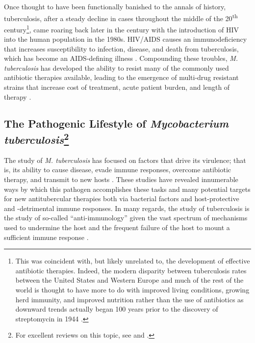 Once thought to have been functionally banished to the annals of history, tuberculosis, after a steady decline in cases throughout the middle of the 20\textsuperscript{th} century\footnote{This was coincident with, but likely unrelated to, the development of effective antibiotic therapies. Indeed, the modern disparity between tuberculosis rates between the United States and Western Europe and much of the rest of the world is thought to have more to do with improved living conditions, growing herd immunity, and improved nutrition rather than the use of antibiotics as downward trends actually began 100 years prior to the discovery of streptomycin in 1944 \citep{Lowbury1958}.}, came roaring back later in the century with the introduction of HIV into the human population in the 1980s. HIV/AIDS causes an immunodeficiency that increases susceptibility to infection, disease, and death from tuberculosis, which has become an AIDS\hyp{}defining illness \citep{Drobniewski1995, Selwyn1992}. Compounding these troubles, \textit{M. tuberculosis} has developed the ability to resist many of the commonly used antibiotic therapies available, leading to the emergence of multi\hyp{}drug resistant strains that increase cost of treatment, acute patient burden, and length of therapy \citep{Matteelli2014}.

\subsection[The Pathogenic Lifestyle of \textit{Mycobacterium tuberculosis}]{The Pathogenic Lifestyle of \textit{Mycobacterium tuberculosis}\footnote{For excellent reviews on this topic, see  and .}}\label{path:tb}

The study of \textit{M. tuberculosis} has focused on factors that drive its virulence; that is, its ability to cause disease, evade immune responses, overcome antibiotic therapy, and transmit to new hosts \citep{Glickman2001b}. These studies have revealed innumerable ways by which this pathogen accomplishes these tasks and many potential targets for new antitubercular therapies both via bacterial factors and host\hyp{}protective and \hyp{}detrimental immune responses. In many regards, the study of tuberculosis is the study of so\hyp{}called ``anti\hyp{}immunology'' given the vast spectrum of mechanisms used to undermine the host and the frequent failure of the host to mount a sufficient immune response \citep{Diacovich2010, Finlay2006}.

